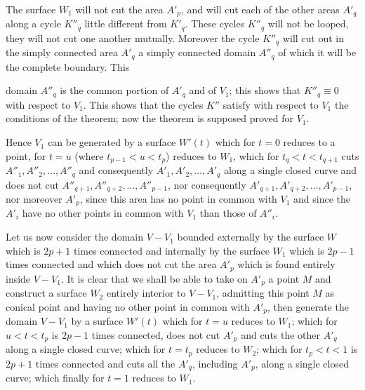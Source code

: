 \documentclass{article}
\begin{document}
The surface $W_{1}$ will not cut the area $A'_{p}$, and will cut each of the other areas $A'_{q}$ along a cycle $K''_{q}$ little different from $K'_{q}$. These cycles $K''_{q}$ will not be looped, they will not cut one another mutually. Moreover the cycle $K''_{q}$ will cut out in the simply connected area $A'_{q}$ a simply connected domain $A''_{q}$ of which it will be the complete boundary. This

domain $A''_{q}$ is the common portion of $A'_{q}$ and of $V_{1}$; this shows that $K''_{q} \equiv 0$ with respect to $V_{1}$. This shows that the cycles $K''$ satisfy with respect to $V_{1}$ the conditions of the theorem; now the theorem is supposed proved for $V_{1}$.

Hence $V_{1}$ can be generated by a surface $W'(t)$ which for $t = 0$ reduces to a point, for $t = u$ (where $t_{p-1} < u < t_{p}$) reduces to $W_{1}$, which for $t_{q} < t < t_{q+1}$ cuts $A''_{1}, A''_{2}, \ldots, A''_{q}$ and consequently $A'_{1}, A'_{2}, \ldots, A'_{q}$ along a single closed curve and does not cut $A''_{q+1}, A''_{q+2}, \ldots, A''_{p-1}$, nor consequently $A'_{q+1}, A'_{q+2}, \ldots, A'_{p-1}$, nor moreover $A'_{p}$, since this area has no point in common with $V_{1}$ and since the $A'_{i}$ have no other points in common with $V_{1}$ than those of $A''_{i}$.

Let us now consider the domain $V - V_{1}$ bounded externally by the surface $W$ which is $2p + 1$ times connected and internally by the surface $W_{1}$ which is $2p - 1$ times connected and which does not cut the area $A'_{p}$ which is found entirely inside $V - V_{1}$. It is clear that we shall be able to take on $A'_{p}$ a point $M$ and construct a surface $W_{2}$ entirely interior to $V - V_{1}$, admitting this point $M$ as conical point and having no other point in common with $A'_{p}$, then generate the domain $V - V_{1}$ by a surface $W'(t)$ which for $t = u$ reduces to $W_{1}$; which for $u < t < t_{p}$ is $2p - 1$ times connected, does not cut $A'_{p}$ and cuts the other $A'_{q}$ along a single closed curve; which for $t = t_{p}$ reduces to $W_{2}$; which for $t_{p} < t < 1$ is $2p + 1$ times connected and cuts all the $A'_{q}$, including $A'_{p}$, along a single closed curve; which finally for $t = 1$ reduces to $W_{1}$.
\end{document}
